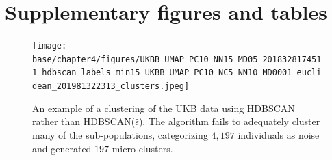 \section{Supplementary figures and tables}

\begin{figure}[ht]
  \centering
    \texttt{[image: base/chapter4/figures/UKBB\_UMAP\_PC10\_NN15\_MD05\_2018328174511\_hdbscan\_labels\_min15\_UKBB\_UMAP\_PC10\_NC5\_NN10\_MD0001\_euclidean\_201981322313\_clusters.jpeg]}
  \caption[Clustering the UKB with basic HDBSCAN]{An example of a clustering of the UKB data using HDBSCAN rather than HDBSCAN($\hat{\epsilon}$). The algorithm fails to adequately cluster many of the sub-populations, categorizing $4,197$ individuals as noise and generated $197$ micro-clusters.}
    \label{fig:supp_ukb_hdbscan_original}  
\end{figure}

\clearpage

